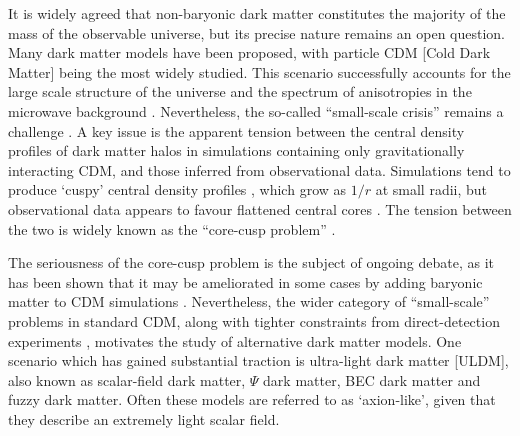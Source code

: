 \documentclass{pasa}%
\begin{document}
It is widely agreed that non-baryonic dark matter constitutes the majority of the mass of the observable universe, but its precise nature remains an open question. Many dark matter models have been proposed, with particle CDM [Cold Dark Matter]  being the most widely studied. This scenario successfully accounts for the large scale structure of the universe \cite{Springel:2005nw} and the spectrum of anisotropies in the microwave background \cite{deBernardis:2000sbo, Hanany:2000qf, Halverson:2001yy, Netterfield:2001yq, Lee:2001yp, Ade:2015xua,  Hu:2001bc}. Nevertheless, the so-called ``small-scale crisis'' remains a challenge \cite{Weinberg:2013aya}. A key issue is the apparent tension between the central density profiles of dark matter halos in simulations containing only gravitationally interacting CDM, and those inferred from observational data. Simulations tend to produce `cuspy' central density profiles \cite{Navarro:1995iw}, which grow as $1/r$ at small radii, but observational data appears to favour flattened central cores \cite{Moore:1994yx}. The tension between the two is widely known as the ``core-cusp problem'' \cite{Dutton:2018nop, Read:2018pft, Genina:2018}. 
 
The seriousness of the core-cusp problem is the subject of  ongoing debate, as it has been shown that it may be ameliorated in some cases by adding baryonic matter to CDM simulations \cite{Benitez-Llambay:2018}. Nevertheless, the wider category of ``small-scale'' problems in standard CDM, along with tighter constraints from direct-detection experiments \cite{Schumann:2019eaa}, motivates the study of alternative dark matter models. One scenario which has gained substantial traction is ultra-light dark matter [ULDM], also known as scalar-field dark matter, $\Psi$ dark matter, BEC dark matter and fuzzy dark matter. Often these models are referred to as `axion-like', given that they describe an extremely light scalar field. %
\end{document}
